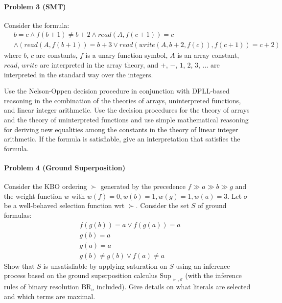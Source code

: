 \paragraph{Problem 3 (SMT)}
    Consider the formula:
\begin{align*}
%
& %
b = c
%
\land
%
f(b + 1)  \neq  b + 2
%
\land
%
\mathit{read}(A,f(c + 1)) = c
~\\~
& %
%
\land
%
(\mathit{read}(A,f(b + 1)) = b + 3 \lor \mathit{read}(\mathit{write}(A,b + 2,f(c)),f(c + 1)) = c + 2)
%
\end{align*}
    where
    $b$, $c$ are constants,
    $f$ is a unary function symbol,
    $A$ is an array constant,
    $\mathit{read}$, $\mathit{write}$ are interpreted in the array theory,
    and
    $+$, $-$, $1$, $2$, $3$, $\ldots$ are interpreted in the standard way over the integers.
    \medskip

    \noindent
    Use the Nelson-Oppen decision procedure in conjunction with DPLL-based
    reasoning in the combination of the theories of arrays,
    uninterpreted functions, and linear integer arithmetic.
    Use the decision procedures for the theory of arrays and the theory of uninterpreted functions and use
    simple mathematical reasoning for deriving new equalities among the
    constants in the theory of linear integer arithmetic.
    If the formula is satisfiable, give an interpretation that satisfies the formula.\bigskip

\paragraph{Problem 4 (Ground Superposition)}
Consider the KBO ordering $\succ$ generated
by the precedence $f \gg a \gg b \gg g$
and the weight function $w$ with $w(f) = 0, w(b) = 1, w(g) = 1, w(a) = 3$.
Let $\sigma$ be a well-behaved selection function wrt $\succ$.
Consider the set $S$ of ground formulas:
\begin{align*}
%
& f(g(b)) = a \lor f(g(a)) = a
~\\~
& g(b) = a
~\\~
& g(a) = a
~\\~
& g(b)  \neq  g(b) \lor f(a)  \neq  a
%
\end{align*}
\noindent Show that $S$ is unsatisfiable by applying saturation on $S$ using an
inference process based on the ground superposition
calculus $\textrm{Sup}_{\succ,\sigma}$ (with the inference rules of
binary  resolution $\textrm{BR}_{\sigma}$ included).
 Give details on what literals
 are selected and which terms are maximal. \bigskip
